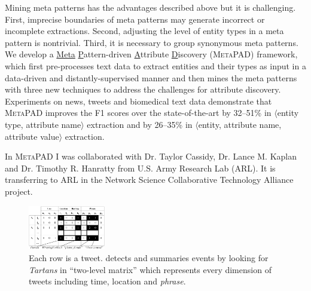 \documentclass[10.5pt]{article}
\newcommand{\lb}{\mbox{$\langle$}}
\newcommand{\rb}{\mbox{$\rangle$}}
\newcommand{\pair}[2]{{\lb#1, #2\rb}\xspace}
\newcommand{\tuple}[3]{{\lb#1, #2, #3\rb}\xspace}
\begin{document}
Mining meta patterns has the advantages described above but it is challenging. First, imprecise boundaries of meta patterns may generate incorrect or incomplete extractions. Second, adjusting the level of entity types in a meta pattern is nontrivial. Third, it is necessary to group synonymous meta patterns. We develop a \underline{Meta} \underline{P}attern-driven \underline{A}ttribute \underline{D}iscovery (\textsc{MetaPAD}) framework, which first pre-processes text data to extract entities and their types as input in a data-driven and distantly-supervised manner and then mines the meta patterns with three new techniques to address the challenges for attribute discovery. Experiments on news, tweets and biomedical text data demonstrate that \textsc{MetaPAD} improves the F1 scores over the state-of-the-art by 32--51\% in \pair{entity type}{attribute name} extraction and by 26--35\% in \tuple{entity}{attribute name}{attribute value} extraction.

\begin{compactitem}
\item In \textsc{MetaPAD} \cite{jiang2016metapad} I was collaborated with Dr. Taylor Cassidy, Dr. Lance M. Kaplan and Dr. Timothy R. Hanratty from U.S. Army Research Lab (ARL). It is transferring to ARL in the Network Science Collaborative Technology Alliance project. 
\end{compactitem}

\vskip 0.05in
\vskip 0.01in


\begin{figure}
\vskip -0.18in
\includegraphics[width=0.3\textwidth]{figure/catchtartan.pdf}
\vskip -0.18in
\caption{Each row is a tweet. \cite{jiang2016catchtartan} detects and summaries events by looking for \textit{Tartans} in ``two-level matrix'' which represents every dimension of tweets including time, location and \textit{phrase}.}
\label{fig:catchtartan}
\vskip -0.20in
\end{figure}
\end{document}
